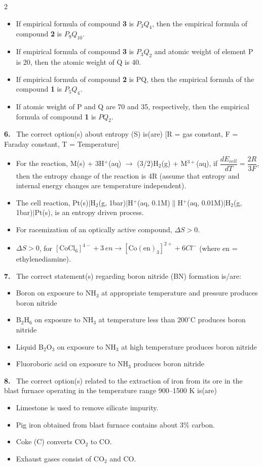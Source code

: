 \documentclass[10pt]{extarticle}
\newcommand{\qn}[1]{\par\smallskip\noindent\textbf{#1.}~}
\newenvironment{qoptions}{\begin{itemize}[leftmargin=1.8em,itemsep=1pt,topsep=2pt,label={}]}{\end{itemize}}
\newcommand{\opt}[2]{\item[(#1)] #2}
\begin{document}
\begin{multicols}{2}
\begin{qoptions}
\opt{A}{If empirical formula of compound \textbf{3} is $P_3Q_4$, then the empirical formula of compound \textbf{2} is $P_9Q_{10}$.}
\opt{B}{If empirical formula of compound \textbf{3} is $P_3Q_2$ and atomic weight of element P is 20, then the atomic weight of Q is 40.}
\opt{C}{If empirical formula of compound \textbf{2} is PQ, then the empirical formula of the compound \textbf{1} is $P_5Q_4$.}
\opt{D}{If atomic weight of P and Q are 70 and 35, respectively, then the empirical formula of compound \textbf{1} is $PQ_2$.}
\end{qoptions}

\qn{6} The correct option(s) about entropy (S) is(are) [R = gas constant, F = Faraday constant, T = Temperature]
\begin{qoptions}
\opt{A}{For the reaction, M(s) + 3H$^+$(aq) $\to$ (3/2)H$_2$(g) + M$^{3+}$(aq), if $\dfrac{dE_{cell}}{dT} = \dfrac{2R}{3F}$, then the entropy change of the reaction is 4R (assume that entropy and internal energy changes are temperature independent).}
\opt{B}{The cell reaction, Pt(s)$\mid$H$_2$(g, 1bar)$\mid$H$^+$(aq, 0.1M)$\parallel$H$^+$(aq, 0.01M)$\mid$H$_2$(g, 1bar)$\mid$Pt(s), is an entropy driven process.}
\opt{C}{For racemization of an optically active compound, $\Delta S>0$.}
\opt{D}{$\Delta S>0$, for $[\mathrm{CoCl_6}]^{4-}+3\,en \to [\mathrm{Co(en)_3}]^{2+}+6Cl^-$ (where en = ethylenediamine).}
\end{qoptions}

\qn{7} The correct statement(s) regarding boron nitride (BN) formation is/are:
\begin{qoptions}
\opt{A}{Boron on exposure to NH$_3$ at appropriate temperature and pressure produces boron nitride}
\opt{B}{B$_2$H$_6$ on exposure to NH$_3$ at temperature less than $200^\circ$C produces boron nitride}
\opt{C}{Liquid B$_2$O$_3$ on exposure to NH$_3$ at high temperature produces boron nitride}
\opt{D}{Fluoroboric acid on exposure to NH$_3$ produces boron nitride}
\end{qoptions}

\qn{8} The correct option(s) related to the extraction of iron from its ore in the blast furnace operating in the temperature range 900--1500 K is(are)
\begin{qoptions}
\opt{A}{Limestone is used to remove silicate impurity.}
\opt{B}{Pig iron obtained from blast furnace contains about 3\% carbon.}
\opt{C}{Coke (C) converts CO$_2$ to CO.}
\opt{D}{Exhaust gases consist of CO$_2$ and CO.}
\end{qoptions}


\end{multicols}
\end{document}
